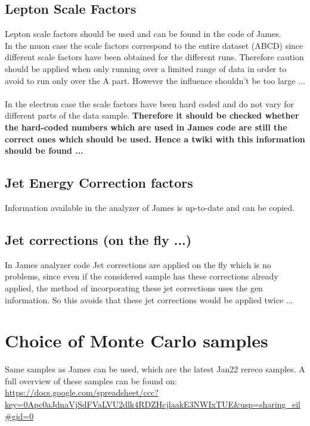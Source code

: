 \documentclass[a4paper,12pt]{report}
\begin{document}
\subsection{Lepton Scale Factors}
Lepton scale factors should be used and can be found in the code of James.\\
In the muon case the scale factors correspond to the entire dataset (ABCD) since different scale factors have been obtained for the different runs. Therefore caution should be applied when only running over a limited range of data in order to avoid to run only over the A part. However the influence shouldn't be too large ...\\
\\
In the electron case the scale factors have been hard coded and do not vary for different parts of the data sample. \textbf{Therefore it should be checked whether the hard-coded numbers which are used in James code are still the correct ones which should be used. Hence a twiki with this information should be found ...}

\subsection{Jet Energy Correction factors}
Information available in the analyzer of James is up-to-date and can be copied.


\subsection{Jet corrections (on the fly ...)}
In James analyzer code Jet corrections are applied on the fly which is no problems, since even if the considered sample has these corrections already applied, the method of incorporating these jet corrections uses the gen information. So this avoids that these jet corrections would be applied twice ...

\section{Choice of Monte Carlo samples}
Same samples as James can be used, which are the latest Jan22 rereco samples. A full overview of these samples can be found on:
\url{https://docs.google.com/spreadsheet/ccc?key=0Apc0aJdnaVjSdFVaLVU2dlk4RDZHcjlaakE3NWIxTUE&usp=sharing_eil#gid=0}

 
\end{document}
